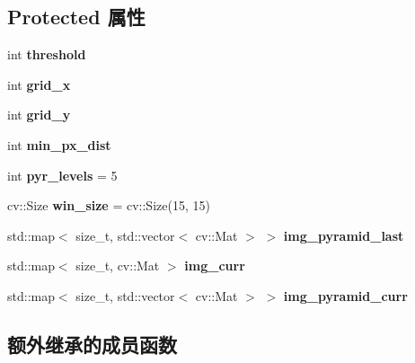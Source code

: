 \subsection*{Protected 属性}
\begin{DoxyCompactItemize}
\item 
\mbox{\label{classov__core_1_1TrackKLT_ab66cf20d8dbd8140c5dddc3d584456d5}} 
int {\bfseries threshold}
\item 
\mbox{\label{classov__core_1_1TrackKLT_afecb0e0e193ad6700b1d03dbdaaf2ec8}} 
int {\bfseries grid\+\_\+x}
\item 
\mbox{\label{classov__core_1_1TrackKLT_ad41e009a38f832b55b833ad17e094b20}} 
int {\bfseries grid\+\_\+y}
\item 
\mbox{\label{classov__core_1_1TrackKLT_afcbe4f18535bc61a978eda8c9e55a724}} 
int {\bfseries min\+\_\+px\+\_\+dist}
\item 
\mbox{\label{classov__core_1_1TrackKLT_a66578875c6e0313f25e53c1de196e9cc}} 
int {\bfseries pyr\+\_\+levels} = 5
\item 
\mbox{\label{classov__core_1_1TrackKLT_ab345d0732346d1f2af5c4a90cd6d24db}} 
cv\+::\+Size {\bfseries win\+\_\+size} = cv\+::\+Size(15, 15)
\item 
\mbox{\label{classov__core_1_1TrackKLT_a0ab430fba27de7331ea06b153db82826}} 
std\+::map$<$ size\+\_\+t, std\+::vector$<$ cv\+::\+Mat $>$ $>$ {\bfseries img\+\_\+pyramid\+\_\+last}
\item 
\mbox{\label{classov__core_1_1TrackKLT_a5240e79f3bd76eae568a5115b9c5e94f}} 
std\+::map$<$ size\+\_\+t, cv\+::\+Mat $>$ {\bfseries img\+\_\+curr}
\item 
\mbox{\label{classov__core_1_1TrackKLT_a0b7ce6ff25bfb1e09652e236cccc89c7}} 
std\+::map$<$ size\+\_\+t, std\+::vector$<$ cv\+::\+Mat $>$ $>$ {\bfseries img\+\_\+pyramid\+\_\+curr}
\end{DoxyCompactItemize}
\subsection*{额外继承的成员函数}


